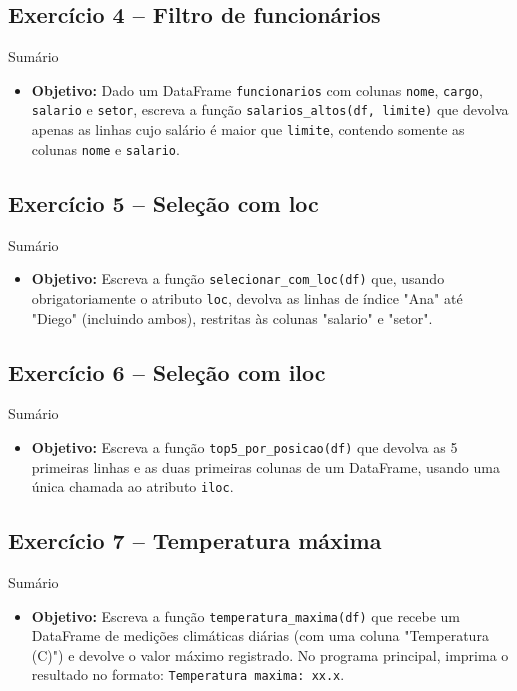 \documentclass[11pt,a4paper]{article}
\begin{document}
\subsection*{Exercício 4 -- Filtro de funcionários}
\begin{exercicio}{Sumário}
\begin{itemize}
    \item \textbf{Objetivo:} Dado um DataFrame \texttt{funcionarios} com colunas \texttt{nome}, \texttt{cargo}, \texttt{salario} e \texttt{setor}, escreva a função \texttt{salarios\_altos(df, limite)} que devolva apenas as linhas cujo salário é maior que \texttt{limite}, contendo somente as colunas \texttt{nome} e \texttt{salario}.
\end{itemize}
\end{exercicio}

\subsection*{Exercício 5 -- Seleção com loc}
\begin{exercicio}{Sumário}
\begin{itemize}
    \item \textbf{Objetivo:} Escreva a função \texttt{selecionar\_com\_loc(df)} que, usando obrigatoriamente o atributo \texttt{loc}, devolva as linhas de índice "Ana" até "Diego" (incluindo ambos), restritas às colunas "salario" e "setor".
\end{itemize}
\end{exercicio}

\subsection*{Exercício 6 -- Seleção com iloc}
\begin{exercicio}{Sumário}
\begin{itemize}
    \item \textbf{Objetivo:} Escreva a função \texttt{top5\_por\_posicao(df)} que devolva as 5 primeiras linhas e as duas primeiras colunas de um DataFrame, usando uma única chamada ao atributo \texttt{iloc}.
\end{itemize}
\end{exercicio}

\subsection*{Exercício 7 -- Temperatura máxima}
\begin{exercicio}{Sumário}
\begin{itemize}
    \item \textbf{Objetivo:} Escreva a função \texttt{temperatura\_maxima(df)} que recebe um DataFrame de medições climáticas diárias (com uma coluna "Temperatura (C)") e devolve o valor máximo registrado. No programa principal, imprima o resultado no formato: \texttt{Temperatura maxima: xx.x}.
\end{itemize}
\end{exercicio}
\end{document}
